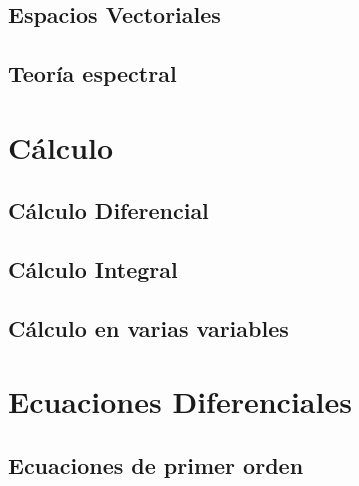 \documentclass[
12pt,
]{tufte-book}
\begin{document}
\chapter{Espacios Vectoriales}







\chapter{Teoría espectral}




	
\part{Cálculo}
	
\chapter{Cálculo Diferencial}








\chapter{Cálculo Integral}
	








\chapter{Cálculo en varias variables}



\part{Ecuaciones Diferenciales}

\chapter{Ecuaciones de primer orden}




\end{document}
